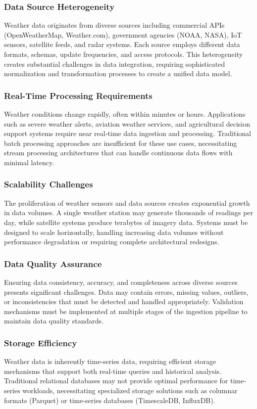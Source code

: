 \documentclass[12pt,a4paper]{article}
\begin{document}
\subsubsection{Data Source Heterogeneity}
Weather data originates from diverse sources including commercial APIs (OpenWeatherMap, Weather.com), government agencies (NOAA, NASA), IoT sensors, satellite feeds, and radar systems. Each source employs different data formats, schemas, update frequencies, and access protocols. This heterogeneity creates substantial challenges in data integration, requiring sophisticated normalization and transformation processes to create a unified data model.

\subsubsection{Real-Time Processing Requirements}
Weather conditions change rapidly, often within minutes or hours. Applications such as severe weather alerts, aviation weather services, and agricultural decision support systems require near real-time data ingestion and processing. Traditional batch processing approaches are insufficient for these use cases, necessitating stream processing architectures that can handle continuous data flows with minimal latency.

\subsubsection{Scalability Challenges}
The proliferation of weather sensors and data sources creates exponential growth in data volumes. A single weather station may generate thousands of readings per day, while satellite systems produce terabytes of imagery data. Systems must be designed to scale horizontally, handling increasing data volumes without performance degradation or requiring complete architectural redesigns.

\subsubsection{Data Quality Assurance}
Ensuring data consistency, accuracy, and completeness across diverse sources presents significant challenges. Data may contain errors, missing values, outliers, or inconsistencies that must be detected and handled appropriately. Validation mechanisms must be implemented at multiple stages of the ingestion pipeline to maintain data quality standards.

\subsubsection{Storage Efficiency}
Weather data is inherently time-series data, requiring efficient storage mechanisms that support both real-time queries and historical analysis. Traditional relational databases may not provide optimal performance for time-series workloads, necessitating specialized storage solutions such as columnar formats (Parquet) or time-series databases (TimescaleDB, InfluxDB).
\end{document}
